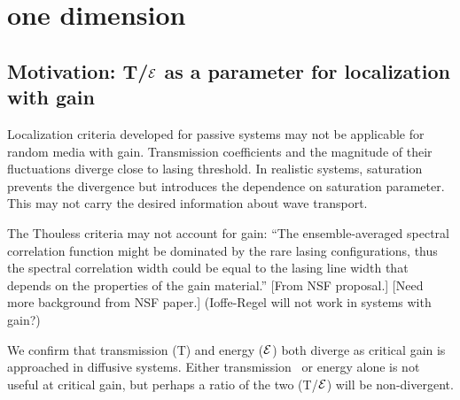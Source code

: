 \section{one dimension}

\subsection {Motivation: T/${\cal E}$ as a parameter for localization with gain}

Localization criteria developed for passive systems may not be applicable for random media with gain. Transmission coefficients and the magnitude of their fluctuations diverge close to lasing threshold. In realistic systems, saturation prevents the divergence but introduces the dependence on saturation parameter. This may not carry the desired information about wave transport.

The Thouless criteria may not account for gain: %
``The ensemble-averaged spectral correlation function might be dominated by the rare lasing configurations, thus the spectral correlation width could be equal to the lasing line width that depends on the properties of the gain material.'' [From NSF proposal.] [Need more background from NSF paper.] (Ioffe-Regel will not work in systems with gain?)

We confirm that transmission (T) and energy (${\cal E}$) both diverge as critical gain is approached in diffusive systems.  Either transmission~\cite{2000_chabanov_nature} or energy alone is not useful at critical gain, but perhaps a ratio of the two (T/${\cal E}$) will be non-divergent.

